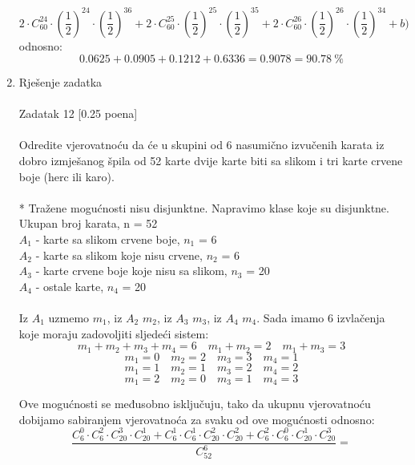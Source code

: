 \documentclass[12pt]{article}
\begin{document}
\begin{enumerate}
\begin{equation*}
        2 \cdot C^{24}_{60} \cdot (\frac{1}{2})^{24} \cdot (\frac{1}{2})^{36} +
        2 \cdot C^{25}_{60} \cdot (\frac{1}{2})^{25} \cdot (\frac{1}{2})^{35} +
        2 \cdot C^{26}_{60} \cdot (\frac{1}{2})^{26} \cdot (\frac{1}{2})^{34} + b)
\end{equation*}	
odnosno:
\begin{equation*}
         0.0625 + 0.0905 + 0.1212 + 0.6336 = 0.9078 = 90.78~\%
\end{equation*}	
		\item Rješenje zadatka \\
		\\
		Zadatak 12 [0.25 poena] \\
		\\
Odredite vjerovatnoću da će u skupini od 6 nasumično izvučenih karata iz
dobro izmješanog špila od 52 karte dvije karte biti sa slikom i tri karte crvene
boje (herc ili karo). \\
 \\
 * Tražene mogućnosti nisu disjunktne. Napravimo klase koje su disjunktne. \\
 Ukupan broj karata, n = 52 \\
$A_1$ - karte sa slikom crvene boje, $n_1$ = 6 \\
$A_2$ - karte sa slikom koje nisu crvene, $n_2$ = 6 \\
$A_3$ - karte crvene boje koje nisu sa slikom, $n_3$ = 20 \\
$A_4$ - ostale karte, $n_4$ = 20 \\
\\
Iz $A_1$ uzmemo $m_1$, iz $A_2$ $m_2$, iz $A_3$ $m_3$, iz $A_4$ $m_4$.
Sada imamo 6 izvlačenja koje moraju zadovoljiti sljedeći sistem:
\begin{equation*}
    m_1 + m_2 + m_3 + m_4 = 6 \quad
    m_1 + m_2 = 2 \quad 
    m_1 + m_3 = 3
\end{equation*}
\begin{equation*}
    m_1 = 0 \quad m_2 = 2 \quad m_3 = 3 \quad m_4 = 1
\end{equation*}
\begin{equation*}
    m_1 = 1 \quad m_2 = 1 \quad m_3 = 2 \quad m_4 = 2
\end{equation*}
\begin{equation*}
    m_1 = 2 \quad m_2 = 0 \quad m_3 = 1 \quad m_4 = 3
\end{equation*}

Ove mogućnosti se međusobno isključuju, tako da ukupnu vjerovatnoću dobijamo sabiranjem
vjerovatnoća za svaku od ove mogućnosti odnosno:
\newpage
\begin{equation*}
    \frac{C^0_{6} \cdot C^2_{6} \cdot C^3_{20} \cdot C^1_{20} +
          C^1_{6} \cdot C^1_{6} \cdot C^2_{20} \cdot C^2_{20} +
          C^2_{6} \cdot C^0_{6} \cdot C^1_{20} \cdot C^3_{20} 
    }{C^6_{52}} = 
\end{equation*}


\end{enumerate}
\end{document}
